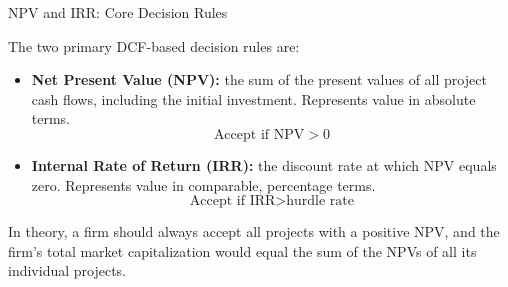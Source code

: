 \documentclass[10pt]{article}
\begin{document}
    \begin{core}[label=core:npvirr]{NPV and IRR: Core Decision Rules}

      The two primary DCF-based decision rules are:

      \begin{itemize}

        \item \textbf{Net Present Value (NPV):} the sum of the present values of all project cash flows, including the initial investment. Represents value in absolute terms.
        \[
          \text{Accept if NPV} > 0
        \]

        \item \textbf{Internal Rate of Return (IRR):} the discount rate at which NPV equals zero. Represents value in comparable, percentage terms.
        \[
          \text{Accept if IRR} > \text{hurdle rate}
        \]

      \end{itemize}

      In theory, a firm should always accept all projects with a positive NPV, and the firm's total market capitalization would equal the sum of the NPVs of all its individual projects.


    \end{core}
\end{document}
